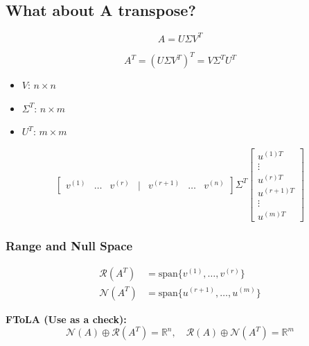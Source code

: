 \begin{derivation}
\end{derivation}

\subsection{What about A transpose?}
\begin{definition}
    \begin{equation*}
        A = U \Sigma V^T
        \end{equation*}
        
        \begin{equation*}
        A^T = (U \Sigma V^T)^T = V \Sigma^T U^T
        \end{equation*}
        \begin{itemize}
            \item $V$: $n \times n$
            \item $\Sigma^T$: $n \times m$
            \item $U^T$: $m \times m$
        \end{itemize}
        \begin{equation*}
            \begin{bmatrix}
            v^{(1)} & \ldots & v^{(r)} & | & v^{(r+1)} & \ldots & v^{(n)}
            \end{bmatrix}
            \Sigma^T
            \begin{bmatrix}
                u^{(1)T} \\ \vdots \\ u^{(r)T} \\ u^{(r+1)T} \\ \vdots \\ u^{(m)T}
            \end{bmatrix}
        \end{equation*}
\end{definition}

\subsubsection{Range and Null Space}
\begin{definition}
    \begin{align*}
        \mathcal{R}(A^T) &= \text{span}\{v^{(1)}, \ldots, v^{(r)}\} \\
        \mathcal{N}(A^T) &= \text{span}\{u^{(r+1)}, \ldots, u^{(m)}\}
    \end{align*}
    
    \vspace{1em}

    \textbf{FToLA (Use as a check):}
    \begin{equation*}
    \mathcal{N}(A) \oplus \mathcal{R}(A^T) = \mathbb{R}^n, \quad \mathcal{R}(A) \oplus \mathcal{N}(A^T) = \mathbb{R}^m
    \end{equation*}
\end{definition}

